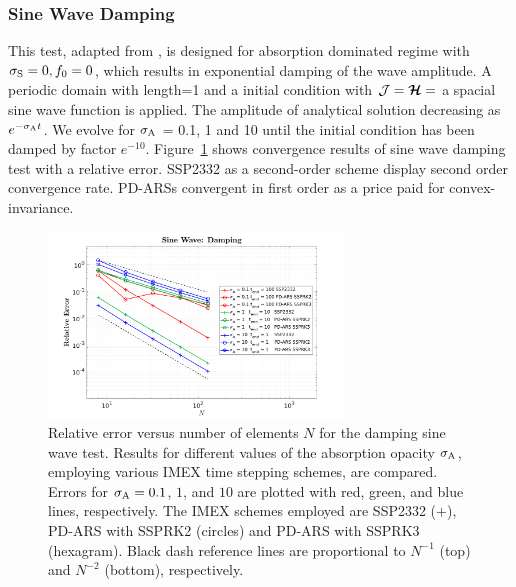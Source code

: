 \subsubsection{Sine Wave Damping}
This test, adapted from \cite{skinnerOstriker_2013}, is designed for absorption dominated regime with $\sigma_{{\rm S}} = 0, f_0 = 0$, which results in exponential damping of the wave amplitude.
A periodic domain with length=1 and a initial condition with $\mathcal{J} = \boldsymbol{\mathcal{H}} =$ a spacial sine wave function is applied.
The amplitude of analytical solution decreasing as $e^{-\sigma_{{\rm A}} t}$.
We evolve for $\sigma_{{\rm A}}$ = 0.1, 1 and 10 until the initial condition has been damped by factor $e^{-10}$. 
Figure~\ref{fig:SineWaveDamping} shows convergence results of sine wave damping test with a relative error.
SSP2332 as a second-order scheme display second order convergence rate.
PD-ARSs convergent in first order as a price paid for convex-invariance.
\begin{figure}[h]
  \centering
    \includegraphics[width=0.7\textwidth]{figures/SineWaveDamping}
   \caption{Relative error versus number of elements $N$ for the damping sine wave test. Results for different values of the absorption opacity $\sigma_{{\rm A}}$, employing various IMEX time stepping schemes, are compared.  Errors for $\sigma_{{\rm A}}=0.1$, $1$, and $10$ are plotted with red, green, and blue lines, respectively.  The IMEX schemes employed are SSP2332 ($+$), PD-ARS with SSPRK2 (circles) and PD-ARS with SSPRK3 (hexagram).  Black dash reference lines are proportional to $N^{-1}$ (top) and $N^{-2}$ (bottom), respectively.}
  \label{fig:SineWaveDamping}
\end{figure}

